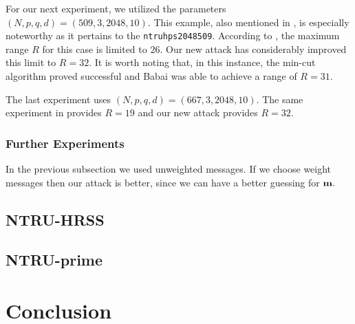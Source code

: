 \documentclass{amsart}
\numberwithin{equation}{section}
\begin{document}
For our next experiment, we utilized the parameters $(N,p,q,d)=(509,3,2048,10)$. This example, also mentioned in \cite[example 5]{adam_draz}, is especially noteworthy as it pertains to the {\texttt{ntruhps2048509}}. According to \cite{adam_draz}, the maximum range $R$ for this case is limited to $26.$ Our new attack has considerably improved this limit to $R=32$. It is worth noting that, in this instance, the min-cut algorithm proved successful and Babai was able to achieve a range of $R=31$.

The last experiment uses $(N,p,q,d)=(667,3,2048,10).$ The same experiment in \cite{adam_draz} provides $R=19$ and our new attack provides $R=32.$ 
\subsubsection{Further Experiments} In the previous subsection we used unweighted messages. If we choose weight messages then our attack is better, since we can have a better  guessing for ${\textbf m}.$ 
\subsection{NTRU-HRSS}
\subsection{NTRU-prime}

\section{Conclusion}

\end{document}
